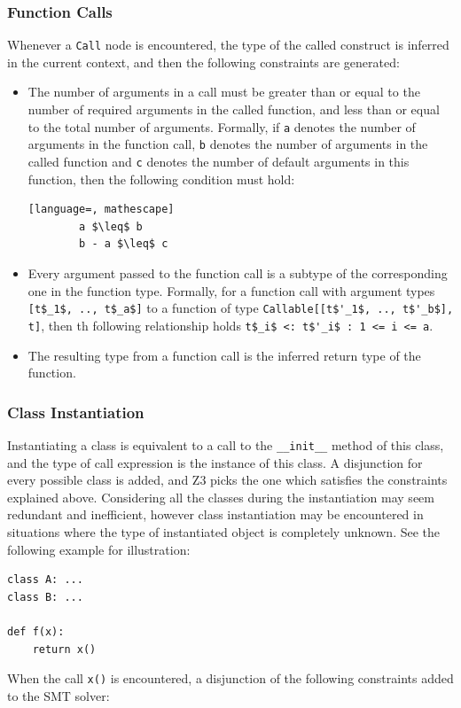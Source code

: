\subsubsection{Function Calls}
Whenever a \lstinline|Call| node is encountered, the type of the called construct is inferred in the current context, and then the following constraints are generated:
\begin{itemize}
	\item The number of arguments in a call must be greater than or equal to the number of required arguments in the called function, and less than or equal to the total number of arguments. Formally, if \lstinline|a| denotes the number of arguments in the function call, \lstinline|b| denotes the number of arguments in the called function and \lstinline|c| denotes the number of default arguments in this function, then the following condition must hold:
	\begin{lstlisting}[language=, mathescape]
		a $\leq$ b
		b - a $\leq$ c
	\end{lstlisting}
	
	\item Every argument passed to the function call is a subtype of the corresponding one in the function type. Formally, for a function call with argument types \lstinline[mathescape]|[t$_1$, .., t$_a$]| to a function of type \lstinline[mathescape]|Callable[[t$'_1$, .., t$'_b$], t]|, then th following relationship holds \lstinline[mathescape]|t$_i$ <: t$'_i$ : 1 <= i <= a|.
	
	\item The resulting type from a function call is the inferred return type of the function.
\end{itemize}

\subsubsection{Class Instantiation}
Instantiating a class is equivalent to a call to the \lstinline|__init__| method of this class, and the type of call expression is the instance of this class. A disjunction for every possible class is added, and Z3 picks the one which satisfies the constraints explained above. Considering all the classes during the instantiation may seem redundant and inefficient, however class instantiation may be encountered in situations where the type of instantiated object is completely unknown. See the following example for illustration:
\begin{lstlisting}
class A: ...
class B: ...

def f(x):
	return x()
\end{lstlisting}
When the call \lstinline|x()| is encountered, a disjunction of the following constraints added to the SMT solver:

